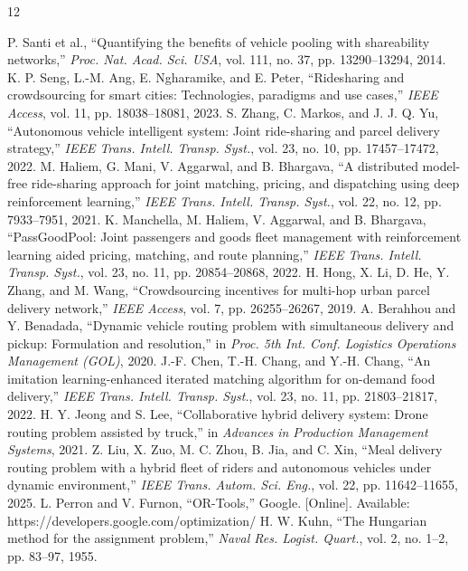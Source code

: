 \documentclass[conference]{IEEEtran}
\begin{document}
\begin{thebibliography}{12}

 P. Santi et al., ``Quantifying the benefits of vehicle pooling with shareability networks,'' \emph{Proc. Nat. Acad. Sci. USA}, vol. 111, no. 37, pp. 13290--13294, 2014.
 K. P. Seng, L.-M. Ang, E. Ngharamike, and E. Peter, ``Ridesharing and crowdsourcing for smart cities: Technologies, paradigms and use cases,'' \emph{IEEE Access}, vol. 11, pp. 18038--18081, 2023.
 S. Zhang, C. Markos, and J. J. Q. Yu, ``Autonomous vehicle intelligent system: Joint ride-sharing and parcel delivery strategy,'' \emph{IEEE Trans. Intell. Transp. Syst.}, vol. 23, no. 10, pp. 17457--17472, 2022.
 M. Haliem, G. Mani, V. Aggarwal, and B. Bhargava, ``A distributed model-free ride-sharing approach for joint matching, pricing, and dispatching using deep reinforcement learning,'' \emph{IEEE Trans. Intell. Transp. Syst.}, vol. 22, no. 12, pp. 7933--7951, 2021.
 K. Manchella, M. Haliem, V. Aggarwal, and B. Bhargava, ``PassGoodPool: Joint passengers and goods fleet management with reinforcement learning aided pricing, matching, and route planning,'' \emph{IEEE Trans. Intell. Transp. Syst.}, vol. 23, no. 11, pp. 20854--20868, 2022.
 H. Hong, X. Li, D. He, Y. Zhang, and M. Wang, ``Crowdsourcing incentives for multi-hop urban parcel delivery network,'' \emph{IEEE Access}, vol. 7, pp. 26255--26267, 2019.
 A. Berahhou and Y. Benadada, ``Dynamic vehicle routing problem with simultaneous delivery and pickup: Formulation and resolution,'' in \emph{Proc. 5th Int. Conf. Logistics Operations Management (GOL)}, 2020.
 J.-F. Chen, T.-H. Chang, and Y.-H. Chang, ``An imitation learning-enhanced iterated matching algorithm for on-demand food delivery,'' \emph{IEEE Trans. Intell. Transp. Syst.}, vol. 23, no. 11, pp. 21803--21817, 2022.
 H. Y. Jeong and S. Lee, ``Collaborative hybrid delivery system: Drone routing problem assisted by truck,'' in \emph{Advances in Production Management Systems}, 2021.
 Z. Liu, X. Zuo, M. C. Zhou, B. Jia, and C. Xin, ``Meal delivery routing problem with a hybrid fleet of riders and autonomous vehicles under dynamic environment,'' \emph{IEEE Trans. Autom. Sci. Eng.}, vol. 22, pp. 11642--11655, 2025.
 L. Perron and V. Furnon, ``OR-Tools,'' Google. [Online]. Available: https://developers.google.com/optimization/
 H. W. Kuhn, ``The Hungarian method for the assignment problem,'' \emph{Naval Res. Logist. Quart.}, vol. 2, no. 1--2, pp. 83--97, 1955.

\end{thebibliography}
\end{document}
